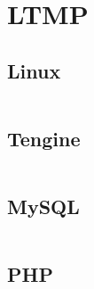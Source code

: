 \chapter{LTMP}



\section{Linux}



\begin{lstlisting}[language=bash]

\end{lstlisting}


\section{Tengine}


\begin{lstlisting}[language=bash]

\end{lstlisting}


\section{MySQL}


\begin{lstlisting}[language=bash]

\end{lstlisting}




\section{PHP}


\begin{lstlisting}[language=bash]

\end{lstlisting}



\begin{lstlisting}[language=bash]

\end{lstlisting}



\begin{lstlisting}[language=bash]

\end{lstlisting}




